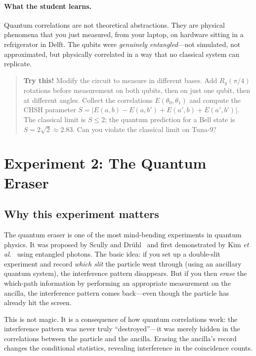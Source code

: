 \documentclass[amsmath,amssymb,reprint,aps,prb]{revtex4-2}
\begin{document}
\paragraph{What the student learns.}
Quantum correlations are not theoretical abstractions.  They are
physical phenomena that you just measured, from your laptop, on
hardware sitting in a refrigerator in Delft.  The qubits were
\emph{genuinely entangled}---not simulated, not approximated, but
physically correlated in a way that no classical system can
replicate.

\begin{quote}
\textbf{Try this!}  Modify the circuit to measure in different
bases.  Add $R_y(\pi/4)$ rotations before measurement on both
qubits, then on just one qubit, then at different angles.
Collect the correlations $E(\theta_0, \theta_1)$ and compute the
CHSH parameter $S = |E(a,b) - E(a,b') + E(a',b) + E(a',b')|$.
The classical limit is $S \leq 2$; the quantum prediction for a
Bell state is $S = 2\sqrt{2} \approx 2.83$.  Can you violate the
classical limit on Tuna-9?
\end{quote}


\section{Experiment 2: The Quantum Eraser}
\label{sec:eraser}

\subsection{Why this experiment matters}

The quantum eraser is one of the most mind-bending experiments
in quantum physics.  It was proposed by Scully and
Dr\"{u}hl~\cite{Scully1982} and first demonstrated by Kim
\textit{et al.}~\cite{Kim2000} using entangled photons.  The
basic idea: if you set up a double-slit experiment and record
\emph{which slit} the particle went through (using an ancillary
quantum system), the interference pattern disappears.  But
if you then \emph{erase} the which-path information by performing
an appropriate measurement on the ancilla, the interference
pattern comes back---even though the particle has already hit the
screen.

This is not magic.  It is a consequence of how quantum
correlations work: the interference pattern was never truly
``destroyed''---it was merely hidden in the correlations between
the particle and the ancilla.  Erasing the ancilla's record
changes the conditional statistics, revealing interference in the
coincidence counts.
\end{document}
